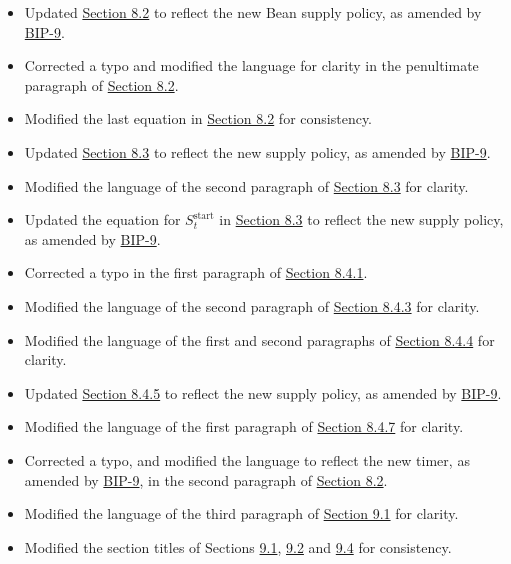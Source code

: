 \documentclass[class=article, crop=false]{standalone}
\begin{document}
\begin{itemize}[topsep=0pt, itemsep=3pt,leftmargin=16pt]
\begin{itemize}
        \item Updated \hyperlink{subsection.8.2}{Section 8.2} to reflect the new Bean supply policy, as amended by \href{https://bean.money/bip-9}{BIP-9}.
        \item Corrected a typo and modified the language for clarity in the penultimate paragraph of \hyperlink{subsection.8.2}{Section 8.2}.
        \item Modified the last equation in \hyperlink{subsection.8.2}{Section 8.2} for consistency.
        \item Updated \hyperlink{subsection.8.3}{Section 8.3} to reflect the new  supply policy, as amended by \href{https://bean.money/bip-9}{BIP-9}.
        \item Modified the language of the second paragraph of \hyperlink{subsection.8.3}{Section 8.3} for clarity.
        \item Updated the equation for $S_t^{\text{start}}$ in \hyperlink{subsection.8.3}{Section 8.3} to reflect the new  supply policy, as amended by \href{https://bean.money/bip-9}{BIP-9}.
        \item Corrected a typo in the first paragraph of \hyperlink{subsubsection.8.4.1}{Section 8.4.1}.
        \item Modified the language of the second paragraph of \hyperlink{subsubsection.8.4.3}{Section 8.4.3} for clarity.
        \item Modified the language of the first and second paragraphs of \hyperlink{subsubsection.8.4.4}{Section 8.4.4} for clarity.
        \item Updated \hyperlink{subsubsection.8.4.5}{Section 8.4.5} to reflect the new  supply policy, as amended by \href{https://bean.money/bip-9}{BIP-9}.
        \item Modified the language of the first paragraph of \hyperlink{subsubsection.8.4.7}{Section 8.4.7} for clarity.
        \item Corrected a typo, and modified the language to reflect the new  timer, as amended by \href{https://bean.money/bip-9}{BIP-9}, in the second paragraph of \hyperlink{subsection.8.2}{Section 8.2}.
        \item Modified the language of the third paragraph of \hyperlink{subsection.9.1}{Section 9.1} for clarity.
        \item Modified the section titles of Sections \hyperlink{subsection.9.1}{9.1}, \hyperlink{subsection.9.2}{9.2} and \hyperlink{subsection.9.4}{9.4} for consistency.

\end{itemize}
\end{itemize}
\end{document}
